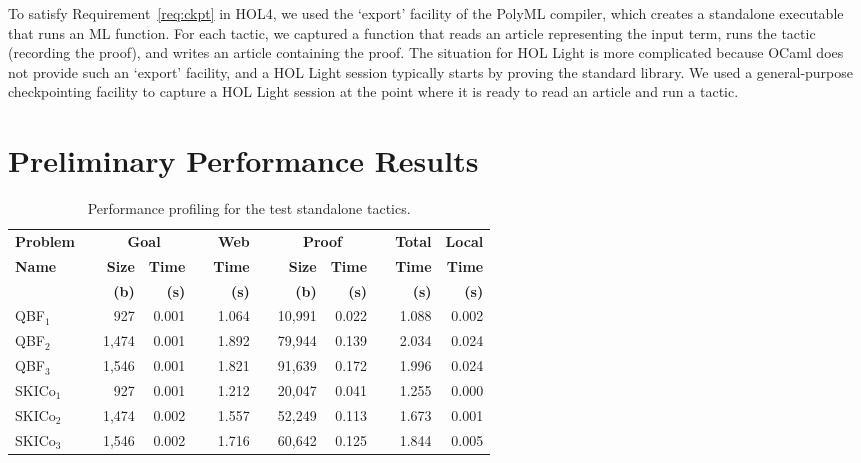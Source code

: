 \documentclass{llncs}
\begin{document}
To satisfy Requirement~\ref{req:ckpt} in HOL4, we used the `export' facility of the PolyML compiler, which creates a standalone executable that runs an ML function.
For each tactic, we captured a function that reads an article representing the input term, runs the tactic (recording the proof), and writes an article containing the proof.
The situation for HOL Light is more complicated because OCaml does not provide such an `export' facility, and a HOL Light session typically starts by proving the standard library.
We used a general-purpose checkpointing facility to capture a HOL Light session at the point where it is ready to read an article and run a tactic.


\section{Preliminary Performance Results}
\label{sec:performance}

\begin{table}
\begin{center}
\begin{tabular}{||@{~}l@{~}||@{}l@{~}r@{~}|@{~}r@{~}l@{}||@{~}r@{~}||@{}l@{~}r@{~}|@{~}r@{~}l@{}||@{~}r@{~}||r@{~}||}
\hline
\textbf{Problem} & & \multicolumn{2}{c}{\textbf{Goal}} & & \textbf{Web} & & \multicolumn{2}{c}{\textbf{Proof}} & & \textbf{Total} & \textbf{Local} \\
\cline{2-4} \cline{7-9}
\textbf{Name} & & \textbf{Size} & \textbf{Time} & & \textbf{Time} & & \textbf{Size} & \textbf{Time} & & \textbf{Time} & \textbf{Time} \\
 & & \textbf{(b)} & \textbf{(s)} & & \textbf{(s)} & & \textbf{(b)} & \textbf{(s)} & & \textbf{(s)} & \textbf{(s)} \\
\hline
QBF${}_1$ & & 927 & 0.001 & & 1.064 & & 10,991 & 0.022 & & 1.088 & 0.002\\
QBF${}_2$ & & 1,474 & 0.001 & & 1.892 & & 79,944 & 0.139 & & 2.034 & 0.024\\
QBF${}_3$ & & 1,546 & 0.001 & & 1.821 & & 91,639 & 0.172 & & 1.996 & 0.024\\
SKICo${}_1$ & & 927 & 0.001 & & 1.212 & & 20,047 & 0.041 & & 1.255 & 0.000\\
SKICo${}_2$ & & 1,474 & 0.002 & & 1.557 & & 52,249 & 0.113 & & 1.673 & 0.001\\
SKICo${}_3$ & & 1,546 & 0.002 & & 1.716 & & 60,642 & 0.125 & & 1.844 & 0.005\\
\hline
\end{tabular}
\end{center}
\caption{Performance profiling for the test standalone tactics.}
\label{tab:performance}
\end{table}
\end{document}
